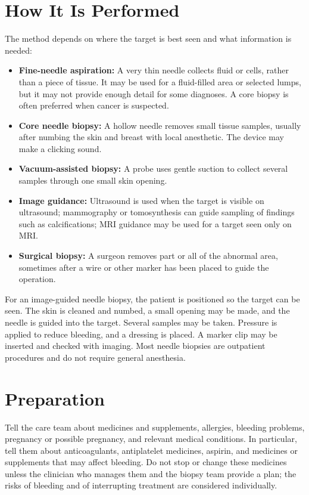 \section*{How It Is Performed}
The method depends on where the target is best seen and what information is needed:
\begin{itemize}
  \item \textbf{Fine-needle aspiration:} A very thin needle collects fluid or cells, rather than a piece of tissue. It may be used for a fluid-filled area or selected lumps, but it may not provide enough detail for some diagnoses. A core biopsy is often preferred when cancer is suspected.
  \item \textbf{Core needle biopsy:} A hollow needle removes small tissue samples, usually after numbing the skin and breast with local anesthetic. The device may make a clicking sound.
  \item \textbf{Vacuum-assisted biopsy:} A probe uses gentle suction to collect several samples through one small skin opening.
  \item \textbf{Image guidance:} Ultrasound is used when the target is visible on ultrasound; mammography or tomosynthesis can guide sampling of findings such as calcifications; MRI guidance may be used for a target seen only on MRI.
  \item \textbf{Surgical biopsy:} A surgeon removes part or all of the abnormal area, sometimes after a wire or other marker has been placed to guide the operation.
\end{itemize}

For an image-guided needle biopsy, the patient is positioned so the target can be seen. The skin is cleaned and numbed, a small opening may be made, and the needle is guided into the target. Several samples may be taken. Pressure is applied to reduce bleeding, and a dressing is placed. A marker clip may be inserted and checked with imaging. Most needle biopsies are outpatient procedures and do not require general anesthesia.

\section*{Preparation}
Tell the care team about medicines and supplements, allergies, bleeding problems, pregnancy or possible pregnancy, and relevant medical conditions. In particular, tell them about anticoagulants, antiplatelet medicines, aspirin, and medicines or supplements that may affect bleeding. Do not stop or change these medicines unless the clinician who manages them and the biopsy team provide a plan; the risks of bleeding and of interrupting treatment are considered individually.

